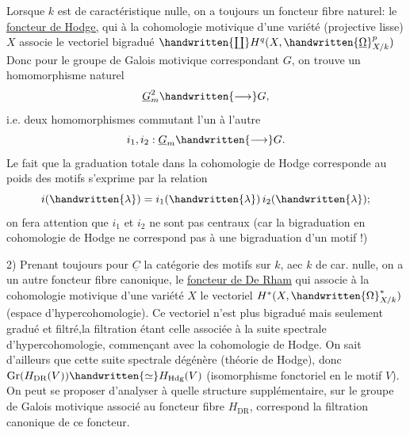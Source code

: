 
Lorsque $k$ est de caractéristique nulle, on a toujours un foncteur fibre naturel: le \uline{foncteur de Hodge,} qui à la cohomologie motivique d'une variété (projective lisse) $X$ associe le vectoriel bigradué $\handwritten{\coprod}H^q(X,\handwritten{\underline{\Omega}}^p_{X/k})$ Donc pour le groupe de Galois motivique correspondant $G$, on trouve un homomorphisme naturel\quad{}
\[
\underline{G}_m^2\handwritten{\longrightarrow}G,
\]
i.e. deux homomorphismes commutant l'un à l'autre\hspace{1em}
\[
i_1,i_2:\underline{G}_m\handwritten{\longrightarrow}G.
\]
Le fait que la graduation totale dans la cohomologie de Hodge corresponde au poids des motifs s'exprime par la relation
\[
i(\handwritten{\lambda})=i_1(\handwritten{\lambda})\,i_2(\handwritten{\lambda});
\]
on fera attention que $i_1$ et $i_2$ ne sont pas centraux (car la bigraduation en cohomologie de Hodge ne correspond pas à une bigraduation d'un motif !)

2) Prenant toujours pour $\underline{C}$ la catégorie des motifs sur $k$, aec $k$ de car. nulle, on a un autre foncteur fibre canonique, le \uline{foncteur de De Rham} qui associe à la cohomologie motivique d'une variété $X$ le vectoriel $H^*(X,\handwritten{\Omega}^*_{X/k})$ (espace d'hypercohomologie). Ce vectoriel n'est plus bigradué mais seulement gradué et filtré,\handwritten{(}la filtration étant celle associée à la suite spectrale d'hypercohomologie, commençant avec la cohomologie de Hodge\handwritten{)}. On sait d'ailleurs que cette suite spectrale dégénère (théorie de Hodge), donc $\operatorname{Gr}(H_{\mathrm{DR}}(V))\handwritten{\simeq}H_{\mathrm{Hdg}}(V)$ (isomorphisme fonctoriel en le motif $V$). On peut se proposer d'analyser à quelle structure supplémentaire, sur le groupe de Galois motivique associé au foncteur fibre $H_{\mathrm{DR}}$, correspond la filtration canonique de ce foncteur.


